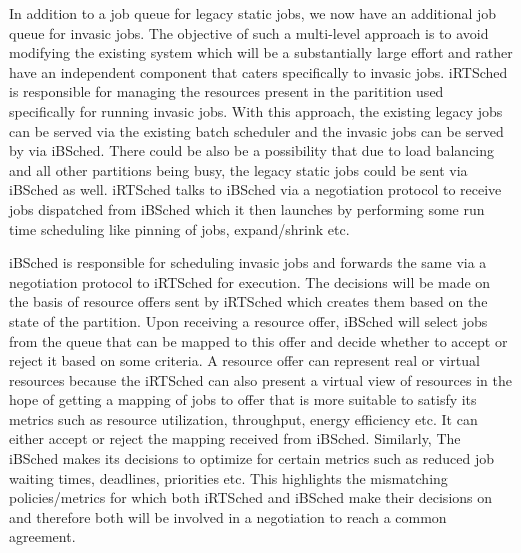 In addition to a job queue for legacy static jobs, we now have an additional job queue for invasic jobs. The objective of such a multi-level approach is to avoid modifying the existing system which will be a substantially large effort and rather have an independent component that caters specifically to invasic jobs. iRTSched is responsible for managing the resources present in the paritition used specifically for running invasic jobs. With this approach, the existing legacy jobs can be served via the existing batch scheduler and the invasic jobs can be served by via iBSched. There could be also be a possibility that due to load balancing and all other partitions being busy, the legacy static jobs could be sent via iBSched as well. iRTSched talks to iBSched via a negotiation protocol to receive jobs dispatched from iBSched which it then launches by performing some run time scheduling like pinning of jobs, expand/shrink etc.\\ \par
\noindent
iBSched is responsible for scheduling invasic jobs and forwards the same via a negotiation protocol to iRTSched for execution. The decisions will be made on the basis of resource offers sent by iRTSched which creates them based on the state of the partition. Upon receiving a resource offer, iBSched will select jobs from the queue that can be mapped to this offer and decide whether to accept or reject it based on some criteria. A resource offer can represent real or virtual resources because the iRTSched can also present a virtual view of resources in the hope of getting a mapping of jobs to offer that is more suitable to satisfy its metrics such as resource utilization, throughput, energy efficiency etc. It can either accept or reject the mapping received from iBSched. Similarly, The iBSched makes its decisions to optimize for certain metrics such as reduced job waiting times, deadlines, priorities etc. This highlights the mismatching policies/metrics for which both iRTSched and iBSched make their decisions on and therefore both will be involved in a negotiation to reach a common agreement.

